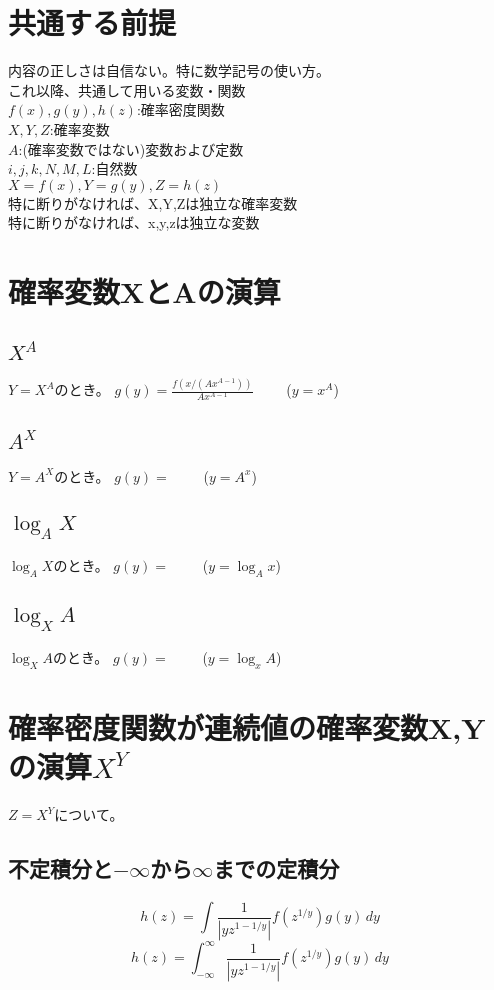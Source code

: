 \documentclass[a4paper,11pt]{ltjsarticle}
\begin{document}
\tableofcontents
\newpage



\section{共通する前提}
内容の正しさは自信ない。特に数学記号の使い方。\\

これ以降、共通して用いる変数・関数\\
$f(x), g(y), h(z)$:確率密度関数\\
$X, Y, Z$:確率変数\\
$A$:(確率変数ではない)変数および定数\\
$i,j,k,N,M,L$:自然数\\
$X=f(x), Y=g(y), Z=h(z)$\\
特に断りがなければ、X,Y,Zは独立な確率変数\\
特に断りがなければ、x,y,zは独立な変数
\newpage


\section{確率変数XとAの演算}
\subsection{$X^A$}
$Y=X^A$のとき。%
$g(y) = \frac{f(x/(Ax^{A-1}))}{Ax^{A-1}}$
\ \ \ \ ($y=x^A$)
\subsection{$A^X$}
$Y=A^X$のとき。
$g(y) = $
\ \ \ \ ($y=A^x$)
\subsection{$\log_AX$}
$\log_AX$のとき。
$g(y) = $
\ \ \ \ ($y=\log_Ax$)
\subsection{$\log_XA$}
$\log_XA$のとき。
$g(y) = $
\ \ \ \ ($y=\log_xA$)
\newpage


\section{確率密度関数が連続値の確率変数X,Yの演算$X^Y$}
$Z=X^Y$について。
\subsection{不定積分と$-\infty$から$\infty$までの定積分}
$$
    h(z) = \int \frac{1}{|yz^{1-1/y}|} f(z^{1/y}) g(y) \, dy
$$
$$
    h(z) = \int_{-\infty}^{\infty} \frac{1}{|yz^{1-1/y}|} f(z^{1/y}) g(y) \, dy
$$
\end{document}
